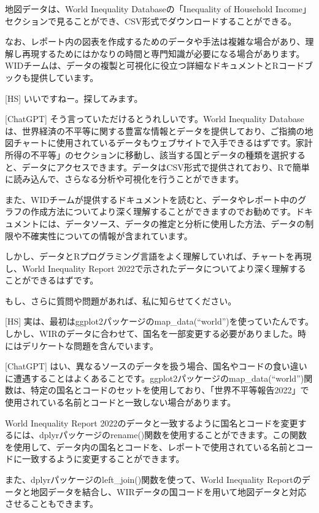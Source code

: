 \documentclass[
]{book}
\theoremstyle{definition}
\theoremstyle{definition}
\theoremstyle{definition}
\theoremstyle{definition}
\theoremstyle{remark}
\begin{document}
地図データは、World Inequality Databaseの「Inequality of Household Income」セクションで見ることができ、CSV形式でダウンロードすることができる。

なお、レポート内の図表を作成するためのデータや手法は複雑な場合があり、理解し再現するためにはかなりの時間と専門知識が必要になる場合があります。WIDチームは、データの複製と可視化に役立つ詳細なドキュメントとRコードブックも提供しています。

{[}HS{]} いいですねー。探してみます。

{[}ChatGPT{]} そう言っていただけるとうれしいです。World Inequality Databaseは、世界経済の不平等に関する豊富な情報とデータを提供しており、ご指摘の地図チャートに使用されているデータもウェブサイトで入手できるはずです。家計所得の不平等」のセクションに移動し、該当する国とデータの種類を選択すると、データにアクセスできます。データはCSV形式で提供されており、Rで簡単に読み込んで、さらなる分析や可視化を行うことができます。

また、WIDチームが提供するドキュメントを読むと、データやレポート中のグラフの作成方法についてより深く理解することができますのでお勧めです。ドキュメントには、データソース、データの推定と分析に使用した方法、データの制限や不確実性についての情報が含まれています。

しかし、データとRプログラミング言語をよく理解していれば、チャートを再現し、World Inequality Report 2022で示されたデータについてより深く理解することができるはずです。

もし、さらに質問や問題があれば、私に知らせてください。

{[}HS{]} 実は、最初はggplot2パッケージのmap\_data(``world'')を使っていたんです。しかし、WIRのデータに合わせて、国名を一部変更する必要がありました。時にはデリケートな問題を含んでいます。

{[}ChatGPT{]} はい、異なるソースのデータを扱う場合、国名やコードの食い違いに遭遇することはよくあることです。ggplot2パッケージのmap\_data(``world'')関数は、特定の国名とコードのセットを使用しており、「世界不平等報告2022」で使用されている名前とコードと一致しない場合があります。

World Inequality Report 2022のデータと一致するように国名とコードを変更するには、dplyrパッケージのrename()関数を使用することができます。この関数を使用して、データ内の国名とコードを、レポートで使用されている名前とコードに一致するように変更することができます。

また、dplyrパッケージのleft\_join()関数を使って、World Inequality Reportのデータと地図データを結合し、WIRデータの国コードを用いて地図データと対応させることもできます。
\end{document}
